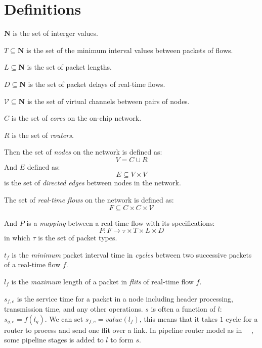 \documentclass[conference, twocolumn]{IEEEtran}
\theoremstyle{definition}
\begin{document}
\section{Definitions}
$\mathbf{N}$ is the set of interger values.

$T \subseteq \mathbf{N}$ is the set of the minimum interval values between
packets of flows.

$L \subseteq \mathbf{N}$ is the set of packet lengths.

$D \subseteq \mathbf{N}$ is the set of packet delays of real-time flows.

$\mathcal{V} \subseteq \mathbf{N}$ is the set of virtual channels between pairs of nodes.

$C$ is the set of {\em cores} on the on-chip network.

$R$ is the set of {\em routers}.

Then the set of {\em nodes} on the network is defined as:
\begin{equation}\label{reio}
V = C \cup R
\end{equation}
And $E$ defined as:
\begin{equation}
E \subseteq V \times V 
\end{equation}
is the set of {\em directed edges} between nodes in the network.

The set of {\em  real-time flows} on the network is defined as:
\begin{equation}
F \subseteq C \times C \times \mathcal{V} 
\end{equation}

And $P$ is a {\em mapping } between a real-time flow with its specifications:
\begin{equation}
P:F \rightarrow \tau \times T \times L \times D
\end{equation}
in which $\tau$ is the set of packet types.

$t_f$ is the {\em minimum} packet interval time in {\em cycles} between
two successive packets of a real-time flow $f$.

$l_f$ is the {\em maximum} length of a packet in {\em flits} of real-time
flow $f$.

$s_{f,e}$ is the service time for a packet in a node including header 
processing, transmission time, and any other operations. $s$ is often a 
function of $l$: $s_{g,e}=f(l_g)$. We can set $s_{f,e}=value(l_f)$, this means
that it takes $1$ cycle for a router to process and send one flit over a link. In pipeline router
model as in ~\cite{PehDelayModel}~\cite{PehSpecPipeR}, some
pipeline stages is added to $l$ to form $s$.
\end{document}
